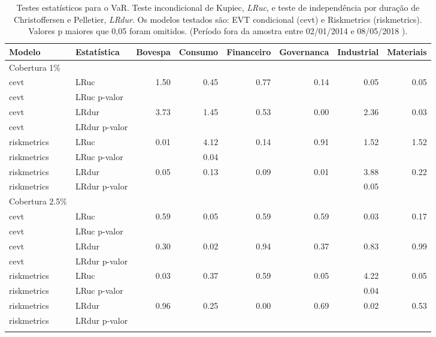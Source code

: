 \begin{longtable}{llrrrrrr}
\caption{Testes estatísticos para o VaR. Teste incondicional de Kupiec, \emph{LRuc}, e teste de
             independência por duração de Christoffersen e Pelletier, \emph{LRdur}. Os modelos testados
são: EVT condicional (cevt) e Riskmetrics (riskmetrics). Valores p maiores que 0,05 foram omitidos. 
             (Período fora da amostra entre 02/01/2014 e  08/05/2018 ).} \\ 
  \toprule
Modelo & Estatística & Bovespa & Consumo & Financeiro & Governanca & Industrial & Materiais \\ 
  \midrule
Cobertura 1\% &  &  &  &  &  &  &  \\ 
  cevt & LRuc & 1.50 & 0.45 & 0.77 & 0.14 & 0.05 & 0.05 \\ 
  cevt & LRuc p-valor &  &  &  &  &  &  \\ 
  cevt & LRdur & 3.73 & 1.45 & 0.53 & 0.00 & 2.36 & 0.03 \\ 
  cevt & LRdur p-valor &  &  &  &  &  &  \\ 
  riskmetrics & LRuc & 0.01 & 4.12 & 0.14 & 0.91 & 1.52 & 1.52 \\ 
  riskmetrics & LRuc p-valor &  & 0.04 &  &  &  &  \\ 
  riskmetrics & LRdur & 0.05 & 0.13 & 0.09 & 0.01 & 3.88 & 0.22 \\ 
  riskmetrics & LRdur p-valor &  &  &  &  & 0.05 &  \\ 
  Cobertura 2.5\% &  &  &  &  &  &  &  \\ 
  cevt & LRuc & 0.59 & 0.05 & 0.59 & 0.59 & 0.03 & 0.17 \\ 
  cevt & LRuc p-valor &  &  &  &  &  &  \\ 
  cevt & LRdur & 0.30 & 0.02 & 0.94 & 0.37 & 0.83 & 0.99 \\ 
  cevt & LRdur p-valor &  &  &  &  &  &  \\ 
  riskmetrics & LRuc & 0.03 & 0.37 & 0.59 & 0.05 & 4.22 & 0.05 \\ 
  riskmetrics & LRuc p-valor &  &  &  &  & 0.04 &  \\ 
  riskmetrics & LRdur & 0.96 & 0.25 & 0.00 & 0.69 & 0.02 & 0.53 \\ 
  riskmetrics & LRdur p-valor &  &  &  &  &  &  \\ 
   \bottomrule
\label{tab:vartest}
\end{longtable}
